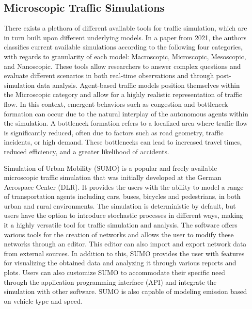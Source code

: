     \subsection{Microscopic Traffic Simulations}\label{traffic-simulations}
        There exists a plethora of different available tools for traffic simulation, which are in turn built upon different underlying models. In a paper from 2021\cite{NGUYEN2021100486}, the authors classifies current available simulations according to the following four categories, with regards to granularity of each model: Macroscopic, Microscopic, Mesoscopic, and Nanoscopic. These tools allow researchers to answer complex questions and evaluate different scenarios in both real-time observations and through post-simulation data analysis. Agent-based traffic models position themselves within the Microscopic category and allow for a highly realistic representation of traffic flow. In this context, emergent behaviors such as congestion and bottleneck formation can occur due to the natural interplay of the autonomous agents within the simulation. A bottleneck formation refers to a localized area where traffic flow is significantly reduced, often due to factors such as road geometry, traffic incidents, or high demand. These bottlenecks can lead to increased travel times, reduced efficiency, and a greater likelihood of accidents\cite{ZENG2021125918bottleneck}.

        Simulation of Urban Mobility (SUMO)\cite{sumo-paper-2012}\cite{sumo-website} is a popular and freely available microscopic traffic simulation that was initially developed at the German Aerospace Center (DLR). It provides the users with the ability to model a range of transportation agents including cars, buses, bicycles and pedestrians, in both urban and rural environments. The simulation is deterministic by default, but users have the option to introduce stochastic processes in different ways, making it a highly versatile tool for traffic simulation and analysis. The software offers various tools for the creation of networks and allows the user to modify these networks through an editor. This editor can also import and export network data from external sources. In addition to this, SUMO provides the user with features for visualizing the obtained data and analyzing it through various reports and plots. Users can also customize SUMO to accommodate their specific need through the application programming interface (API) and integrate the simulation with other software. SUMO is also capable of modeling emission based on vehicle type and speed.

